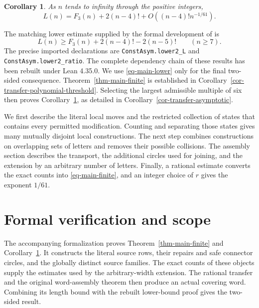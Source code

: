 \documentclass[11pt]{article}
\newtheorem{corollary}[theorem]{Corollary}
\theoremstyle{definition}
\theoremstyle{remark}
\begin{document}
\begin{corollary}\label{cor-main-asymptotic}
As $n$ tends to infinity through the positive integers,
\[
 L(n)=F_3(n)+2(n-4)!+
 O\!\left((n-4)!n^{-1/61}\right).
\]
\end{corollary}

The matching lower estimate supplied by the formal development of
\cite{halfar-asym} is
\begin{equation}\label{eq-main-lower}
 L(n)\ge F_3(n)+2(n-4)!-2(n-5)!\qquad(n\ge7).
\end{equation}
The precise imported declarations are \texttt{ConstAsym.lower2\_L} and
\texttt{ConstAsym.lower2\_ratio}. The complete dependency chain of these
results has been rebuilt under Lean 4.35.0.
We use \eqref{eq-main-lower} only for the final two-sided consequence.
Theorem~\ref{thm-main-finite} is established in
Corollary~\ref{cor-transfer-polynomial-threshold}. Selecting the largest
admissible multiple of six then proves
Corollary~\ref{cor-main-asymptotic}, as detailed in
Corollary~\ref{cor-transfer-asymptotic}.

We first describe the literal local moves and the restricted collection
of states that contains every permitted modification. Counting and
separating those states gives many mutually disjoint local constructions.
The next step combines constructions on overlapping sets of letters and
removes their possible collisions. The assembly section describes the
transport, the additional circles used for joining, and the extension by
an arbitrary number of letters. Finally, a rational estimate converts the
exact counts into \eqref{eq-main-finite}, and an integer choice of $r$
gives the exponent $1/61$.






\section{Formal verification and scope}

The accompanying formalization proves Theorem~\ref{thm-main-finite} and
Corollary~\ref{cor-main-asymptotic}. It constructs the literal source rows,
their repairs and safe connector circles, and the globally distinct source
families. The exact counts of these objects supply the estimates used by
the arbitrary-width extension. The rational transfer and the original
word-assembly theorem then produce an actual covering word. Combining its
length bound with the rebuilt lower-bound proof gives the two-sided result.
\end{document}
